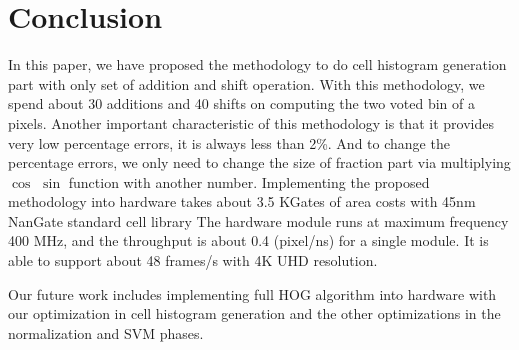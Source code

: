 %
%

\section{Conclusion}
\label{sec:conclusion}

In this paper, we have proposed the methodology to do cell histogram generation
part with only set of  addition and shift operation.
With this methodology, we spend about 30 additions and 40 shifts on computing
the two voted bin of a pixels.
Another important characteristic of this methodology is that it provides very
low percentage errors, it is always less than 2\%.
And to change the percentage errors, we only need to change the size of fraction
part via multiplying $\cos$ $\sin$ function with another number.
Implementing the proposed methodology into hardware takes about 3.5 KGates  of
area costs with 45nm NanGate standard cell library
The hardware module runs at maximum frequency 400 MHz, and the throughput is
about 0.4 (pixel/ns) for a single module.
It is able to support about 48 frames/s with 4K UHD resolution.


Our future work includes implementing full HOG algorithm into hardware with our
optimization in cell histogram generation  and
the other optimizations in the normalization and SVM phases.

